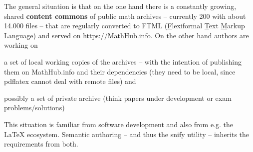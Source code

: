 \documentclass[runningheads]{llncs}
\newcommand\snify{\textsf{snify}\xspace}
\begin{document}
The general situation is that on the one hand there is a constantly growing, shared
\textbf{content commons} of public math archives -- currently 200 with about 14.000 \sTeX
files -- that are regularly converted to FTML (\underline{F}lexiformal \underline{T}ext
\underline{M}arkup \underline{L}anguage) and served on \url{https://MathHub.info}. On the
other hand authors are working on
\begin{compactenum}[\em i\rm)]
\item a set of local working copies of the archives -- with the intention of publishing
  them on MathHub.info and their dependencies (they need to be local, since pdflatex
  cannot deal with remote files) and
\item possibly a set of private archive (think papers under development or exam
  problems/solutions) 
\end{compactenum}
This situation is familiar from software development and also from e.g. the \LaTeX
ecosystem. Semantic authoring -- and thus the \snify utility -- inherits the requirements
from both.
\end{document}
